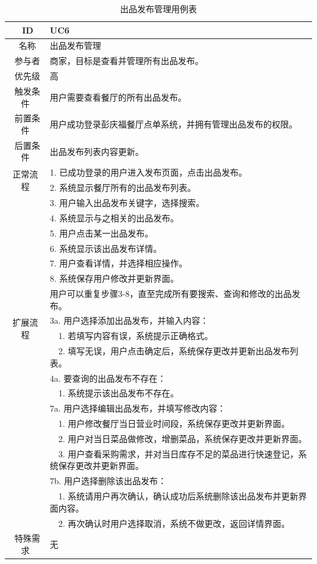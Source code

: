 \begin{table}[htbp!]
  \footnotesize
  \centering
  \caption{出品发布管理用例表}
  \vspace{2mm}
  \begin{tabular}{cp{11.5cm}}
   \hline
   \ ID & UC6 \\ 
   \hline
   \ 名称 & 出品发布管理 \\ 
   \hline
   \ 参与者 & 商家，目标是查看并管理所有出品发布。 \\ 
   \hline
   \ 优先级 & 高 \\ 
   \hline
   \ 触发条件 & 用户需要查看餐厅的所有出品发布。 \\ 
   \hline
   \ 前置条件 & 用户成功登录彭庆福餐厅点单系统，并拥有管理出品发布的权限。 \\ 
   \hline
   \ 后置条件 & 出品发布列表内容更新。 \\ 
   \hline
   \multirow{2}{*}{正常流程}
    & 1.	已成功登录的用户进入发布页面，点击出品发布。\\
    & 2.	系统显示餐厅所有的出品发布列表。\\
    & 3.	用户输入出品发布关键字，选择搜索。\\
    & 4.	系统显示与之相关的出品发布。\\
    & 5.  用户点击某一出品发布。\\
    & 6.  系统显示该出品发布详情。\\
    & 7.  用户查看详情，并选择相应操作。\\
    & 8.  系统保存用户修改并更新界面。\\
    & 用户可以重复步骤3-8，直至完成所有要搜索、查询和修改的出品发布。\\
   \hline
   \multirow{2}{*}{扩展流程}
    & 3a. 用户选择添加出品发布，并输入内容：\\
    & ~~1.	若填写内容有误，系统提示正确格式。\\
    & ~~2.	填写无误，用户点击确定后，系统保存更改并更新出品发布列表。\\
    & 4a. 要查询的出品发布不存在：\\
    & ~~1.	系统提示该出品发布不存在。\\
    & 7a. 用户选择编辑出品发布，并填写修改内容：\\
    & ~~1.	用户修改餐厅当日营业时间段，系统保存更改并更新界面。\\
    & ~~2.	用户对当日菜品做修改，增删菜品，系统保存更改并更新界面。\\
    & ~~3.	用户查看采购需求，并对当日库存不足的菜品进行快速登记，系统保存更改并更新界面。\\
    & 7b. 用户选择删除该出品发布：\\
    & ~~1.	系统请用户再次确认，确认成功后系统删除该出品发布并更新界面内容。\\
    & ~~2.	再次确认时用户选择取消，系统不做更改，返回详情界面。\\
  \hline
  \ 特殊需求 & 无 \\ 
  \hline
  \end{tabular}
  \label{table:uc5}
\end{table}

